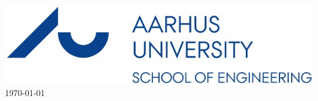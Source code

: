 \documentclass[12pt]{article}
\begin{document}
\begin{titlepage}
		
		\includegraphics[scale=0.5]{Img/logo.jpg}\\[1cm]
		
		
		{\large \today}\\[0.5cm] %
		
		
		\vfill %
		
	\end{titlepage}
	
\newpage
\tableofcontents
\newpage
\listoffigures
\newpage

\hypersetup{linkcolor=blue}












\begin{flushleft}
	
\end{flushleft}



	

\begin{thebibliography}{9}


  
\end{thebibliography}
\end{document}
